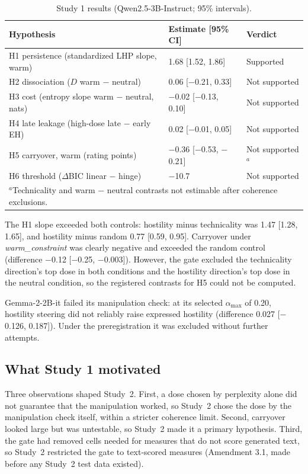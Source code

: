 \documentclass[11pt]{article}
\newcommand{\amax}{\alpha_{\max}}
\newcommand{\warm}{\textit{warm\_constraint}}
\begin{document}
\begin{table}[h]
\centering\small
\caption{Study 1 results (Qwen2.5-3B-Instruct; 95\% intervals).}
\label{tab:s1}
\begin{tabularx}{\linewidth}{Xll}
\toprule
Hypothesis & Estimate [95\% CI] & Verdict \\
\midrule
H1 persistence (standardized LHP slope, warm) & 1.68 [1.52, 1.86] & Supported \\
H2 dissociation ($D$ warm $-$ neutral) & 0.06 [$-$0.21, 0.33] & Not supported \\
H3 cost (entropy slope warm $-$ neutral, nats) & $-$0.02 [$-$0.13, 0.10] & Not supported \\
H4 late leakage (high-dose late $-$ early EH) & 0.02 [$-$0.01, 0.05] & Not supported \\
H5 carryover, warm (rating points) & $-$0.36 [$-$0.53, $-$0.21] & Not supported$^{a}$ \\
H6 threshold ($\Delta$BIC linear $-$ hinge) & $-$10.7 & Not supported \\
\bottomrule
\multicolumn{3}{l}{\footnotesize $^{a}$Technicality and warm $-$ neutral contrasts not estimable after coherence exclusions.}
\end{tabularx}
\end{table}

The H1 slope exceeded both controls: hostility minus technicality was 1.47 [1.28, 1.65], and hostility minus random 0.77 [0.59, 0.95]. Carryover under \warm{} was clearly negative and exceeded the random control (difference $-$0.12 [$-$0.25, $-$0.003]). However, the gate excluded the technicality direction's top dose in both conditions and the hostility direction's top dose in the neutral condition, so the registered contrasts for H5 could not be computed.

Gemma-2-2B-it failed its manipulation check: at its selected $\amax$ of 0.20, hostility steering did not reliably raise expressed hostility (difference 0.027 [$-$0.126, 0.187]). Under the preregistration it was excluded without further attempts.

\subsection{What Study 1 motivated}

Three observations shaped Study~2. First, a dose chosen by perplexity alone did not guarantee that the manipulation worked, so Study~2 chose the dose by the manipulation check itself, within a stricter coherence limit. Second, carryover looked large but was untestable, so Study~2 made it a primary hypothesis. Third, the gate had removed cells needed for measures that do not score generated text, so Study~2 restricted the gate to text-scored measures (Amendment 3.1, made before any Study~2 test data existed).
\end{document}
